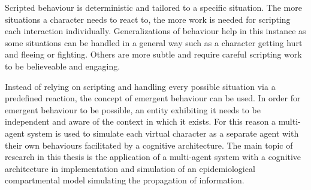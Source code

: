 Scripted behaviour is deterministic and tailored to a specific situation.
The more situations a character needs to react to, the more work is needed for scripting each interaction individually.
Generalizations of behaviour help in this instance as some situations can be handled in a general way such as a character getting hurt and fleeing or fighting.
Others are more subtle and require careful scripting work to be believeable and engaging.

Instead of relying on scripting and handling every possible situation via a predefined reaction, the concept of emergent behaviour can be used.
In order for emergent behaviour to be possible, an entity exhibiting it needs to be independent and aware of the context in which it exists.
For this reason a multi-agent system is used to simulate each virtual character as a separate agent with their own behaviours facilitated by a cognitive architecture.
The main topic of research in this thesis is the application of a multi-agent system with a cognitive architecture in implementation and simulation of an epidemiological compartmental model simulating the propagation of information.




